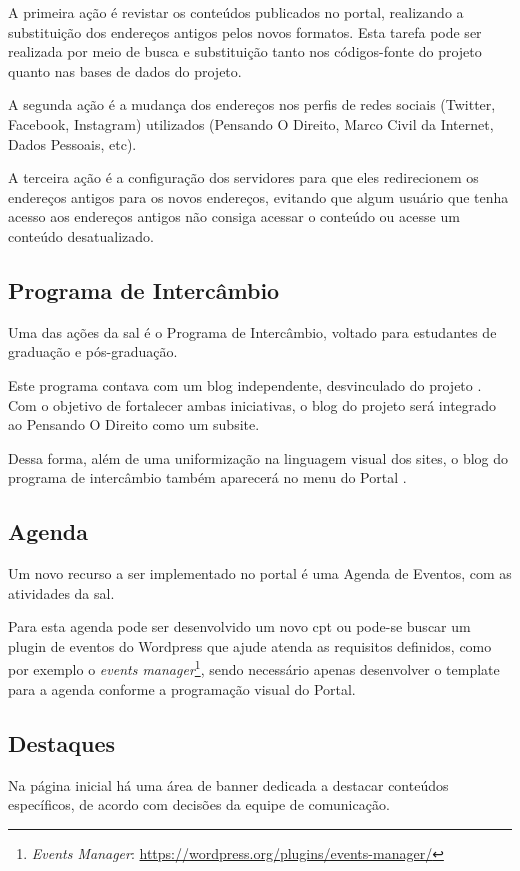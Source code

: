 A primeira ação é revistar os conteúdos publicados no portal, realizando a substituição dos endereços antigos pelos novos formatos. Esta tarefa pode ser realizada por meio de busca e substituição tanto nos códigos-fonte do projeto quanto nas bases de dados do projeto.

A segunda ação é a mudança dos endereços nos perfis de redes sociais (Twitter, Facebook, Instagram) utilizados (Pensando O Direito, Marco Civil da Internet, Dados Pessoais, etc).

A terceira ação é a configuração dos servidores para que eles redirecionem os endereços antigos para os novos endereços, evitando que algum usuário que tenha acesso aos endereços antigos não consiga acessar o conteúdo ou acesse um conteúdo desatualizado.





\subsection{Programa de Intercâmbio}
Uma das ações da \gls{sal} é o Programa de Intercâmbio, voltado para estudantes de graduação e pós-graduação.

Este programa contava com um blog independente, desvinculado do projeto \ppod. Com o objetivo de fortalecer ambas iniciativas, o blog do projeto será integrado ao Pensando O Direito como um subsite.

Dessa forma, além de uma uniformização na linguagem visual dos sites, o blog do programa de intercâmbio também aparecerá no menu do Portal \ppod.

\subsection{Agenda}
Um novo recurso a ser implementado no portal é uma Agenda de Eventos, com as atividades da \gls{sal}.

Para esta agenda pode ser desenvolvido um novo \gls{cpt} ou pode-se buscar um plugin de eventos do Wordpress que ajude atenda as requisitos definidos, como por exemplo o \textit{events manager}\footnote{\textit{Events Manager}: \url{https://wordpress.org/plugins/events-manager/}}, sendo necessário apenas desenvolver o template para a agenda conforme a programação visual do Portal.

\subsection{Destaques}
Na página inicial há uma área de banner dedicada a destacar conteúdos específicos, de acordo com decisões da equipe de comunicação.

